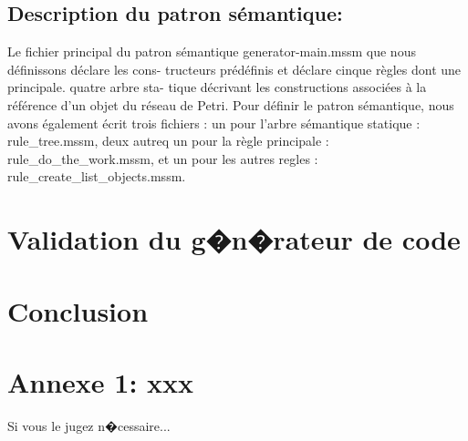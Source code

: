 \documentclass[10pt,a4paper]{article}
\begin{document}
\subsection {Description du patron sémantique:}

                                                                                            
Le fichier principal du patron sémantique generator-main.mssm que nous définissons déclare les cons-            
tructeurs prédéfinis et déclare cinque règles dont une principale. quatre arbre sta-
tique décrivant les constructions associées à la référence d’un objet du réseau de Petri.
Pour définir le patron sémantique, nous avons également écrit trois  fichiers  : un
 pour l’arbre sémantique statique : rule_tree.mssm, 
deux autreq un pour la règle principale : rule_do_the_work.mssm,
et un pour les autres regles : rule_create_list_objects.mssm.


\section{Validation du g�n�rateur de code}


\section{Conclusion}


\vfill
\eject
\section*{Annexe 1: xxx}
Si vous le jugez n�cessaire...
 
\end{document}
